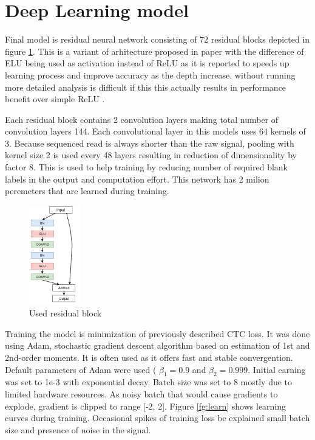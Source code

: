 \documentclass[times, utf8, diplomski, numeric, english]{fer}
\begin{document}
\section{Deep Learning model}

Final model is residual neural network consisting of 72 residual blocks depicted in figure \ref{fg:model_block}. This is a variant of arhitecture proposed in paper \cite{identitet} with the difference of ELU being used as activation instead of ReLU as it is reported\cite{resnet-elu} to speeds up learning process and improve accuracy as the depth increase. 
without running more detailed analysis is difficult if this this actually results in performance benefit over simple ReLU .

Each residual block contains 2 convolution layers making total number of convolution layers 144. Each convolutional layer in this models uses 64 kernels of 3. Because  sequenced read is always shorter than the raw signal, pooling with kernel size 2 is used every 48 layers resulting in reduction of dimensionality by factor 8. This is used to help training by reducing number of required blank labels in the output and computation effort. This network has 2 milion peremeters that are learned during training.


\begin{figure}[!ht]
	\begin{center}
		\includegraphics[width=0.2\textwidth]{./imgs/model.png}
		\caption{Used residual block}
		\label{fg:model_block}
	\end{center}
\end{figure}


Training the model is minimization of previously described CTC loss. It was done using Adam, stochastic gradient descent algorithm based on estimation of 1st and 2nd-order moments.
It is often used as it offers fast and stable convergention. Default parameters of Adam were used (
$\beta_1=0.9$ and $\beta_2=0.999$. Initial earning was set to 1e-3 with exponential decay. Batch size was set to 8 mostly due to limited hardware resources. As noisy batch that would cause gradients to explode, gradient is clipped to range [-2, 2].
Figure \ref{fg:learn} shows learning curves during training. Occasional spikes of training loss be explained small batch size and presence of noise in the signal. 
\end{document}
